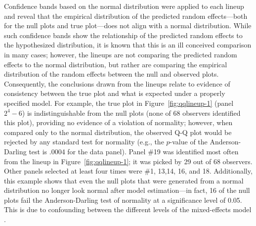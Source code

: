 \documentclass[12pt]{article} %
\newcommand{\hh}[1]{{\color{orange} #1}}
\newcommand{\al}[1]{{\color{ForestGreen} #1}}
\begin{document}
Confidence bands based on the normal distribution were applied to each lineup and reveal that the empirical distribution of the predicted random effects---both for the null plots and true plot---does not align with a normal distribution. While such confidence bands show the relationship of the predicted random effects to the hypothesized distribution, it is known that this is an ill conceived comparison in many cases; however, the lineups are not comparing the predicted random effects to the normal distribution, but rather are comparing the empirical distribution of the random effects between the null and observed plots. Consequently, the conclusions drawn from the lineups relate to evidence of consistency between the true plot and what is expected under a properly specified model. For example, the true plot in Figure~\ref{fig:qqlineup-1} (panel $2^4 - 6$) is indistinguishable from the null plots (none of 68 observers identified this plot), providing no evidence of a violation of normality; however, when compared only to the normal distribution, the observed Q-Q plot would %
be rejected by any standard test for normality (e.g., the $p$-value of the Anderson-Darling test is .0004 for the data panel).
Panel \#19 was identified  most often from the lineup in Figure~\ref{fig:qqlineup-1}; it was picked by 29 out of 68 observers. Other panels  selected at least four times were \#1, 13,14, 16, and 18. 
Additionally, this example shows that even the null plots that were generated from a normal distribution no longer look normal after  model estimation---in fact, 16 of the null plots fail the Anderson-Darling test of normality at a significance level of 0.05. This is due to confounding between the different levels of the mixed-effects model  \citep{adam}.
\end{document}
